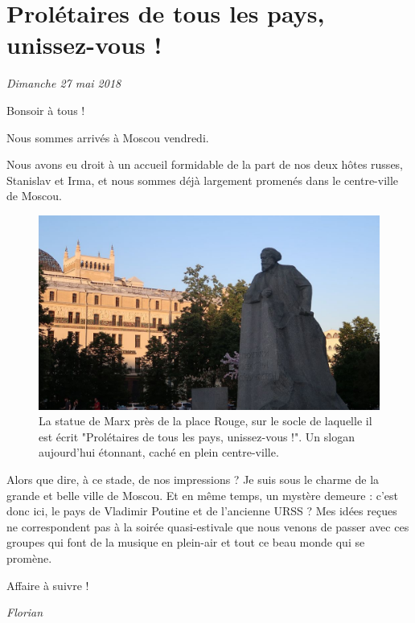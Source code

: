 \hypertarget{proluxe9taires-de-tous-les-pays-unissez-vous}{%
\section{Prolétaires de tous les pays, unissez-vous
!}\label{proluxe9taires-de-tous-les-pays-unissez-vous}}

\emph{Dimanche 27 mai 2018}

Bonsoir à tous !

Nous sommes arrivés à Moscou vendredi.

Nous avons eu droit à un accueil formidable de la part de nos deux hôtes
russes, Stanislav et Irma, et nous sommes déjà largement promenés dans
le centre-ville de Moscou.

\begin{figure}
\centering
\includegraphics{images/20180527_marx.JPG}
\caption{La statue de Marx près de la place Rouge, sur le socle de
laquelle il est écrit "Prolétaires de tous les pays, unissez-vous !". Un
slogan aujourd'hui étonnant, caché en plein centre-ville.}
\end{figure}

Alors que dire, à ce stade, de nos impressions ? Je suis sous le charme
de la grande et belle ville de Moscou. Et en même temps, un mystère
demeure : c'est donc ici, le pays de Vladimir Poutine et de l'ancienne
URSS ? Mes idées reçues ne correspondent pas à la soirée quasi-estivale
que nous venons de passer avec ces groupes qui font de la musique en
plein-air et tout ce beau monde qui se promène.

Affaire à suivre !

\emph{Florian}

